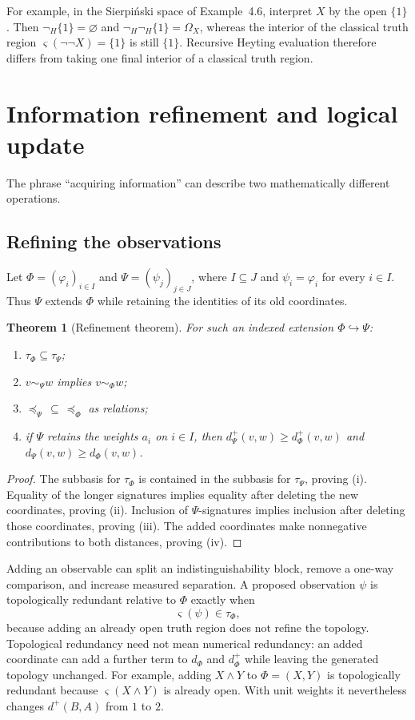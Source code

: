 \documentclass[11pt]{article}
\theoremstyle{definition}
\theoremstyle{plain}
\newtheorem{theorem}[definition]{Theorem}
\theoremstyle{remark}
\begin{document}
For example, in the Sierpi\'nski space of Example~4.6, interpret $X$ by the
open $\{1\}$.  Then $\neg_H\{1\}=\varnothing$ and
$\neg_H\neg_H\{1\}=\Omega_X$, whereas the interior of the classical truth
region $\varsigma(\neg\neg X)=\{1\}$ is still $\{1\}$.  Recursive Heyting
evaluation therefore differs from taking one final interior of a classical
truth region.

\section{Information refinement and logical update}

The phrase ``acquiring information'' can describe two mathematically different
operations.

\subsection{Refining the observations}

Let $\Phi=(\varphi_i)_{i\in I}$ and $\Psi=(\psi_j)_{j\in J}$, where
$I\subseteq J$ and $\psi_i=\varphi_i$ for every $i\in I$.  Thus $\Psi$ extends
$\Phi$ while retaining the identities of its old coordinates.

\begin{theorem}[Refinement theorem]
For such an indexed extension $\Phi\hookrightarrow\Psi$:
\begin{enumerate}[label=(\roman*)]
\item $\tau_\Phi\subseteq\tau_\Psi$;
\item $v\sim_\Psi w$ implies $v\sim_\Phi w$;
\item $\preceq_\Psi\,\subseteq\,\preceq_\Phi$ as relations;
\item if $\Psi$ retains the weights $a_i$ on $i\in I$, then
      $d_\Psi^+(v,w)\geq d_\Phi^+(v,w)$ and $d_\Psi(v,w)\geq d_\Phi(v,w)$.
\end{enumerate}
\end{theorem}

\begin{proof}
The subbasis for $\tau_\Phi$ is contained in the subbasis for $\tau_\Psi$, proving
(i).  Equality of the longer signatures implies equality after deleting the
new coordinates, proving (ii).  Inclusion of $\Psi$-signatures implies inclusion
after deleting those coordinates, proving (iii).  The added coordinates make
nonnegative contributions to both distances, proving (iv).
\end{proof}

Adding an observable can split an indistinguishability block, remove a
one-way comparison, and increase measured separation.  A proposed observation
$\psi$ is topologically redundant relative to $\Phi$ exactly when
\[
 \varsigma(\psi)\in\tau_\Phi,
\]
because adding an already open truth region does not refine the topology.
Topological redundancy need not mean numerical redundancy: an added coordinate
can add a further term to $d_\Phi$ and $d_\Phi^+$ while leaving the generated
topology unchanged.  For example, adding $X\wedge Y$ to $\Phi=(X,Y)$ is
topologically redundant because $\varsigma(X\wedge Y)$ is already open.  With
unit weights it nevertheless changes $d^+(B,A)$ from $1$ to $2$.
\end{document}
